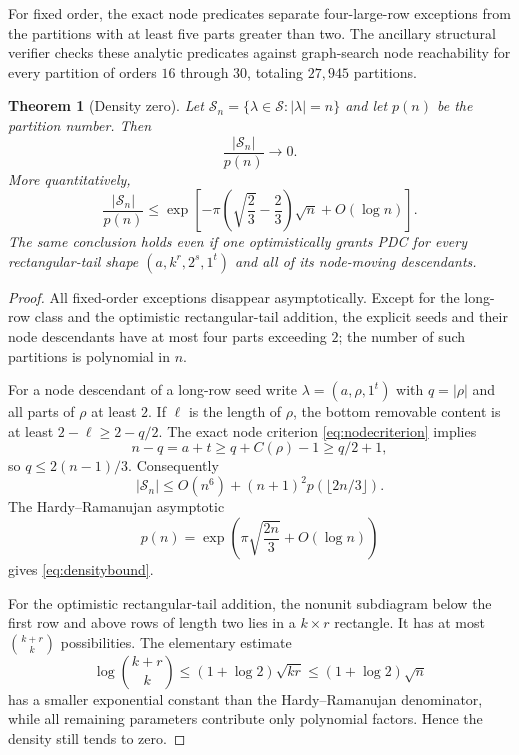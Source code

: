 \documentclass[11pt]{article}
\newtheorem{theorem}{Theorem}[section]
\theoremstyle{definition}
\begin{document}
For fixed order, the exact node predicates separate four-large-row exceptions from the partitions with at least five parts greater than two.  The ancillary structural verifier checks these analytic predicates against graph-search node reachability for every partition of orders $16$ through $30$, totaling $27,945$ partitions.

\begin{theorem}[Density zero]\label{thm:density}
Let $\mathcal S_n=\{\lambda\in\mathcal S:|\lambda|=n\}$ and let $p(n)$ be the partition number.  Then
\[
 \frac{|\mathcal S_n|}{p(n)}\longrightarrow0.
\]
More quantitatively,
\begin{equation}\label{eq:densitybound}
 \frac{|\mathcal S_n|}{p(n)}
 \le\exp\left[-\pi\left(\sqrt{\frac23}-\frac23\right)\sqrt n+O(\log n)\right].
\end{equation}
The same conclusion holds even if one optimistically grants PDC for every rectangular-tail shape $(a,k^r,2^s,1^t)$ and all of its node-moving descendants.
\end{theorem}

\begin{proof}
All fixed-order exceptions disappear asymptotically.  Except for the long-row class and the optimistic rectangular-tail addition, the explicit seeds and their node descendants have at most four parts exceeding $2$; the number of such partitions is polynomial in $n$.

For a node descendant of a long-row seed write $\lambda=(a,\rho,1^t)$ with $q=|\rho|$ and all parts of $\rho$ at least $2$.  If $\ell$ is the length of $\rho$, the bottom removable content is at least $2-\ell\ge2-q/2$.  The exact node criterion \eqref{eq:nodecriterion} implies
\[
 n-q=a+t\ge q+C(\rho)-1\ge q/2+1,
\]
so $q\le2(n-1)/3$.  Consequently
\[
 |\mathcal S_n|\le O(n^6)+(n+1)^2p(\lfloor2n/3\rfloor).
\]
The Hardy--Ramanujan asymptotic \cite{HardyRamanujan1918}
\[
 p(n)=\exp\left(\pi\sqrt{\frac{2n}{3}}+O(\log n)\right)
\]
gives \eqref{eq:densitybound}.

For the optimistic rectangular-tail addition, the nonunit subdiagram below the first row and above rows of length two lies in a $k\times r$ rectangle.  It has at most $\binom{k+r}{k}$ possibilities.  The elementary estimate
\[
 \log\binom{k+r}{k}\le(1+\log2)\sqrt{kr}\le(1+\log2)\sqrt n
\]
has a smaller exponential constant than the Hardy--Ramanujan denominator, while all remaining parameters contribute only polynomial factors.  Hence the density still tends to zero.
\end{proof}
\end{document}
